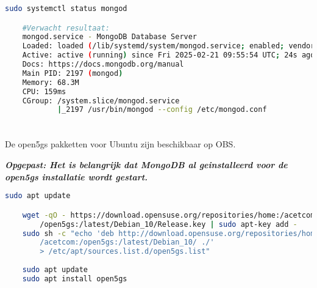 \begin{lstlisting}[language=Bash, caption=Controle MongoDB status]
    sudo systemctl status mongod

    #Verwacht resultaat:
    mongod.service - MongoDB Database Server
    Loaded: loaded (/lib/systemd/system/mongod.service; enabled; vendor pr>
    Active: active (running) since Fri 2025-02-21 09:55:54 UTC; 24s ago
    Docs: https://docs.mongodb.org/manual
    Main PID: 2197 (mongod)
    Memory: 68.3M
    CPU: 159ms
    CGroup: /system.slice/mongod.service
            |_2197 /usr/bin/mongod --config /etc/mongod.conf
\end{lstlisting}

\section{}

De \gls{open5gs} pakketten voor Ubuntu zijn beschikbaar op OBS. 

\textit{\textbf{Opgepast: Het is belangrijk dat MongoDB al geinstalleerd voor de \gls{open5gs} installatie wordt gestart.}} \autocite{Lee2025a}


    

\begin{lstlisting}[language=Bash, caption=Installatie van Open5GS]
    sudo apt update

    wget -qO - https://download.opensuse.org/repositories/home:/acetcom:
        /open5gs:/latest/Debian_10/Release.key | sudo apt-key add -
    sudo sh -c "echo 'deb http://download.opensuse.org/repositories/home:
        /acetcom:/open5gs:/latest/Debian_10/ ./' 
        > /etc/apt/sources.list.d/open5gs.list"
    
    sudo apt update
    sudo apt install open5gs
\end{lstlisting}

